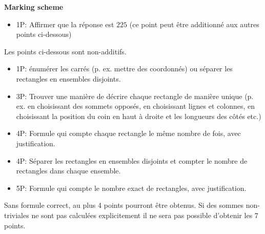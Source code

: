 {\textbf{Marking scheme}%
\begin{itemize}
    \item 1P: Affirmer que la réponse est $225$ (ce point peut être additionné aux autres points ci-dessous)
\end{itemize}
Les points ci-dessous sont non-additifs.
\begin{itemize}
    \item 1P: énumérer les carrés (p. ex. mettre des coordonnés) ou séparer les rectangles en ensembles disjoints.
    \item 3P: Trouver une manière de décrire chaque rectangle de manière unique (p. ex. en choisissant des sommets opposés, en choisissant lignes et colonnes, en choisissant la position du coin en haut à droite et les longueurs des côtés etc.)
    \item 4P: Formule qui compte chaque rectangle le même nombre de fois, avec justification. 
    \item 4P: Séparer les rectangles en ensembles disjoints et compter le nombre de rectangles dans chaque ensemble.
    \item 5P: Formule qui compte le nombre exact de rectangles, avec justification.
\end{itemize} 

Sans formule correct, au plus 4 points pourront être obtenus. Si des sommes non-triviales ne sont pas calculées explicitement il ne sera pas possible d'obtenir les 7 points.}

